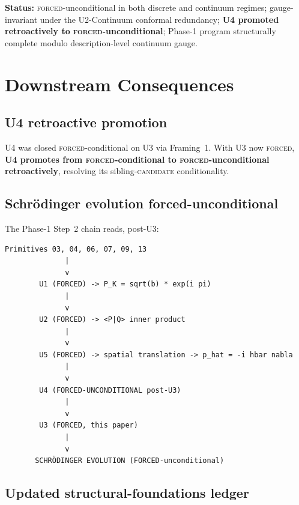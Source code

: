\documentclass[11pt,a4paper]{article}
\begin{document}
\textbf{Status:} \textsc{forced}-unconditional in both discrete and continuum regimes; gauge-invariant under the U2-Continuum conformal redundancy; \textbf{U4 promoted retroactively to \textsc{forced}-unconditional}; Phase-1 program structurally complete modulo description-level continuum gauge.

\section{Downstream Consequences}\label{sec:downstream}

\subsection{U4 retroactive promotion}

U4 was closed \textsc{forced}-conditional on U3 via Framing~1. With U3 now \textsc{forced}, \textbf{U4 promotes from \textsc{forced}-conditional to \textsc{forced}-unconditional retroactively}, resolving its sibling-\textsc{candidate} conditionality.

\subsection{Schr\"odinger evolution forced-unconditional}

The Phase-1 Step~2 chain reads, post-U3:
\begin{verbatim}
Primitives 03, 04, 06, 07, 09, 13
              |
              v
        U1 (FORCED) -> P_K = sqrt(b) * exp(i pi)
              |
              v
        U2 (FORCED) -> <P|Q> inner product
              |
              v
        U5 (FORCED) -> spatial translation -> p_hat = -i hbar nabla
              |
              v
        U4 (FORCED-UNCONDITIONAL post-U3)
              |
              v
        U3 (FORCED, this paper)
              |
              v
       SCHRÖDINGER EVOLUTION (FORCED-unconditional)
\end{verbatim}

\subsection{Updated structural-foundations ledger}
\end{document}
